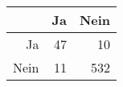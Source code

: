 \begin{table}[ht]
\centering
\begin{tabular}{rrr}
  \hline
 & Ja & Nein \\ 
  \hline
Ja &  47 &  10 \\ 
  Nein &  11 & 532 \\ 
   \hline
\end{tabular}
\end{table}
